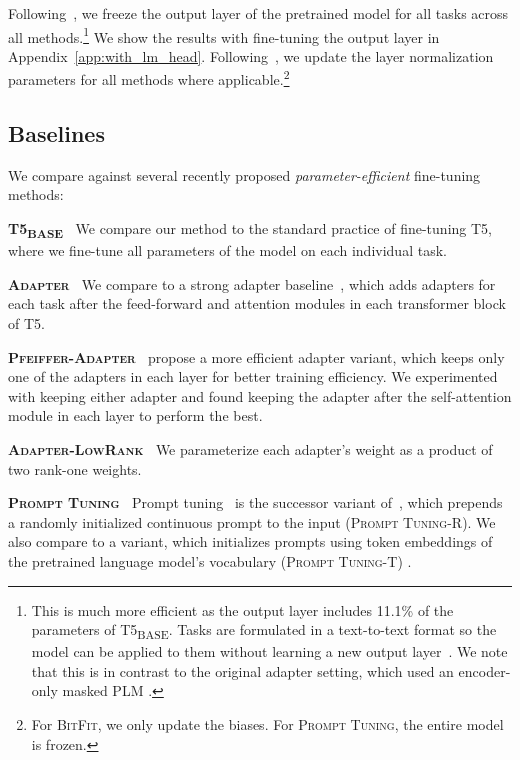 Following~\citet{karimi2021parameter-efficient}, we freeze the output layer of the pretrained model for all tasks across all methods.\footnote{This is much more efficient as the output layer includes 11.1\% of the parameters of T5\textsubscript{\tiny BASE}. Tasks are formulated in a text-to-text format so the model can be applied to them without learning a new output layer~\citep{raffel2019exploring}. We note that this is in contrast to the original adapter setting, which used an encoder-only masked PLM \citep{houlsby2019parameter}.} We show the results with fine-tuning the output layer in Appendix~\ref{app:with_lm_head}. Following~\citet{houlsby2019parameter}, we update the layer normalization parameters for all methods where applicable.\footnote{For \textsc{BitFit}, we only update the biases. For \textsc{Prompt Tuning}, the entire model is frozen.} 

\subsection{Baselines}

We compare against several recently proposed \emph{parameter-efficient} fine-tuning methods: 

\textbf{T5\textsubscript{\tiny BASE}} $\:$ We compare our method to the standard practice of fine-tuning T5, where we fine-tune all parameters of the model on each individual task. 

\textbf{\textsc{Adapter}} $\:$ We compare to a strong adapter baseline~\citep{houlsby2019parameter}, which adds adapters for each task after the feed-forward and attention modules in each transformer block of T5. 

\textbf{\textsc{Pfeiffer-Adapter}} $\:$ \citet{Pfeiffer2021adapterfusion} propose a more efficient adapter variant, which keeps only one of the adapters in each layer for better training efficiency. We experimented with keeping either adapter and found keeping the adapter after the self-attention module in each layer to perform the best.

\textbf{\textsc{Adapter-LowRank}} $\:$ We parameterize each adapter's weight as a product of two rank-one weights. 

\textbf{\textsc{Prompt Tuning}} $\:$ Prompt tuning~\citep{lester2021power} is the successor variant of~\citet{li2021prefix}, which prepends a randomly initialized continuous prompt to the input (\textsc{Prompt Tuning-R}). We also compare to a variant, which initializes prompts using token embeddings of the pretrained language model's vocabulary (\textsc{Prompt Tuning-T}) \citep{lester2021power}.

